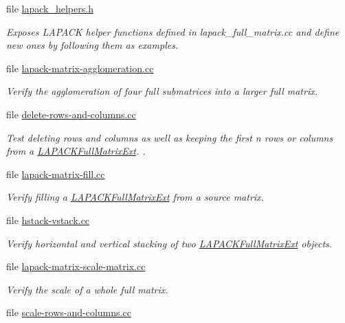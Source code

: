 \begin{DoxyCompactItemize}
\item 
file \hyperlink{lapack__helpers_8h}{lapack\+\_\+helpers.\+h}
\begin{DoxyCompactList}\small\item\em Exposes L\+A\+P\+A\+CK helper functions defined in lapack\+\_\+full\+\_\+matrix.\+cc and define new ones by following them as examples. \end{DoxyCompactList}\item 
file \hyperlink{lapack-matrix-agglomeration_8cc}{lapack-\/matrix-\/agglomeration.\+cc}
\begin{DoxyCompactList}\small\item\em Verify the agglomeration of four full submatrices into a larger full matrix. \end{DoxyCompactList}\item 
file \hyperlink{delete-rows-and-columns_8cc}{delete-\/rows-\/and-\/columns.\+cc}
\begin{DoxyCompactList}\small\item\em Test deleting rows and columns as well as keeping the first {\ttfamily n} rows or columns from a \hyperlink{classLAPACKFullMatrixExt}{L\+A\+P\+A\+C\+K\+Full\+Matrix\+Ext}. . \end{DoxyCompactList}\item 
file \hyperlink{lapack-matrix-fill_8cc}{lapack-\/matrix-\/fill.\+cc}
\begin{DoxyCompactList}\small\item\em Verify filling a \hyperlink{classLAPACKFullMatrixExt}{L\+A\+P\+A\+C\+K\+Full\+Matrix\+Ext} from a source matrix. \end{DoxyCompactList}\item 
file \hyperlink{hstack-vstack_8cc}{hstack-\/vstack.\+cc}
\begin{DoxyCompactList}\small\item\em Verify horizontal and vertical stacking of two \hyperlink{classLAPACKFullMatrixExt}{L\+A\+P\+A\+C\+K\+Full\+Matrix\+Ext} objects. \end{DoxyCompactList}\item 
file \hyperlink{lapack-matrix-scale-matrix_8cc}{lapack-\/matrix-\/scale-\/matrix.\+cc}
\begin{DoxyCompactList}\small\item\em Verify the scale of a whole full matrix. \end{DoxyCompactList}\item 
file \hyperlink{scale-rows-and-columns_8cc}{scale-\/rows-\/and-\/columns.\+cc}

\end{DoxyCompactItemize}
